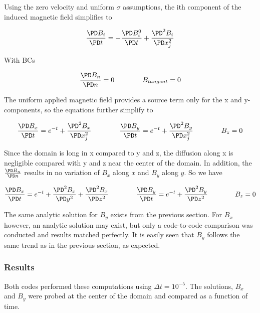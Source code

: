 \documentclass[11pt]{article}
\newcommand{\figS}{22.1em}
\newcommand{\figH}{\figS}
\newcommand{\figW}{\figS}
\begin{document}
Using the zero velocity and uniform $\sigma$ assumptions, the ith component of the induced magnetic field simplifies to

\begin{equation}
	\frac{\PD B_i}{\PD t}
	=
	-
	\frac{\PD B_i^0}{\PD t}
	+
	\frac{\PD^2 B_i}{\PD x_j^2}
\end{equation}

With BCs

\begin{equation}
	\frac{\PD B_{n}}{\PD n} = 0
	\qquad \qquad
	B_{tangent} = 0
\end{equation}

The uniform applied magnetic field provides a source term only for the x and y-components, so the equations further simplify to

\begin{equation}
	\frac{\PD B_x}{\PD t}
	=
	e^{-t}
	+
	\frac{\PD^2 B_x}{\PD x_j^2}
	\qquad \qquad
	\frac{\PD B_y}{\PD t}
	=
	e^{-t}
	+
	\frac{\PD^2 B_y}{\PD x_j^2}
	\qquad \qquad
	B_z = 0
\end{equation}

Since the domain is long in x compared to y and z, the diffusion along x is negligible compared with y and z near the center of the domain. In addition, the $\frac{\PD B_n}{\PD n}$ results in no variation of $B_x$ along $x$ and $B_y$ along $y$. So we have

\begin{equation}
	\frac{\PD B_x}{\PD t}
	=
	e^{-t}
	+
	\frac{\PD^2 B_x}{\PD y^2}
	+
	\frac{\PD^2 B_x}{\PD z^2}
	\qquad \qquad
	\frac{\PD B_y}{\PD t}
	=
	e^{-t}
	+
	\frac{\PD^2 B_y}{\PD z^2}
	\qquad \qquad
	B_z = 0
\end{equation}

The same analytic solution for $B_y$ exists from the previous section. For $B_x$ however, an analytic solution may exist, but only a code-to-code comparison was conducted and results matched perfectly. It is easily seen that $B_y$ follows the same trend as in the previous section, as expected.

\subsubsection{Results}
Both codes performed these computations using $\Delta t = 10^{-5}$. The solutions, $B_x$ and $B_y$ were probed at the center of the domain and compared as a function of time.

\end{document}

